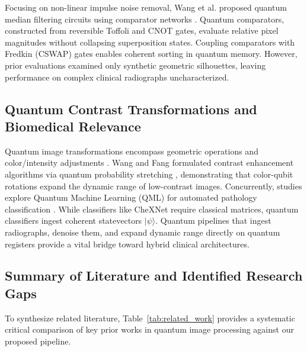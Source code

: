 \documentclass[12pt,onecolumn,draftclsnofoot]{IEEEtran}
\begin{document}
Focusing on non-linear impulse noise removal, Wang et al. proposed quantum median filtering circuits using comparator networks \cite{wang2022quantum}. Quantum comparators, constructed from reversible Toffoli and CNOT gates, evaluate relative pixel magnitudes without collapsing superposition states. Coupling comparators with Fredkin (CSWAP) gates enables coherent sorting in quantum memory. However, prior evaluations examined only synthetic geometric silhouettes, leaving performance on complex clinical radiographs uncharacterized.

\subsection{Quantum Contrast Transformations and Biomedical Relevance}
Quantum image transformations encompass geometric operations and color/intensity adjustments \cite{hu2019quantum}. Wang and Fang formulated contrast enhancement algorithms via quantum probability stretching \cite{wang2020quantum}, demonstrating that color-qubit rotations expand the dynamic range of low-contrast images. Concurrently, studies explore Quantum Machine Learning (QML) for automated pathology classification \cite{biamonte2017quantum, cerezo2021variational}. While classifiers like CheXNet \cite{rajpurkar2017chexnet} require classical matrices, quantum classifiers ingest coherent statevectors $|\psi\rangle$. Quantum pipelines that ingest radiographs, denoise them, and expand dynamic range directly on quantum registers provide a vital bridge toward hybrid clinical architectures.

\subsection{Summary of Literature and Identified Research Gaps}
To synthesize related literature, Table~\ref{tab:related_work} provides a systematic critical comparison of key prior works in quantum image processing against our proposed pipeline.
\end{document}
